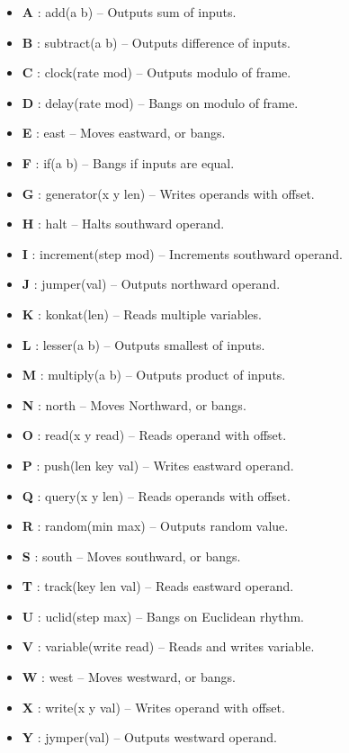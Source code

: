 \documentclass[a4paper]{report}
\begin{document}
\begin{itemize}
  \item \textbf{A} : add(a b) -- Outputs sum of inputs.
  \item \textbf{B} : subtract(a b) -- Outputs difference of inputs.
  \item \textbf{C} : clock(rate mod) -- Outputs modulo of frame.
  \item \textbf{D} : delay(rate mod) -- Bangs on modulo of frame.
  \item \textbf{E} : east -- Moves eastward, or bangs.
  \item \textbf{F} : if(a b) -- Bangs if inputs are equal.
  \item \textbf{G} : generator(x y len) -- Writes operands with offset.
  \item \textbf{H} : halt -- Halts southward operand.
  \item \textbf{I} : increment(step mod) -- Increments southward operand.
  \item \textbf{J} : jumper(val) -- Outputs northward operand.
  \item \textbf{K} : konkat(len) -- Reads multiple variables.
  \item \textbf{L} : lesser(a b) -- Outputs smallest of inputs.
  \item \textbf{M} : multiply(a b) -- Outputs product of inputs.
  \item \textbf{N} : north -- Moves Northward, or bangs.
  \item \textbf{O} : read(x y read) -- Reads operand with offset.
  \item \textbf{P} : push(len key val) -- Writes eastward operand.
  \item \textbf{Q} : query(x y len) -- Reads operands with offset.
  \item \textbf{R} : random(min max) -- Outputs random value.
  \item \textbf{S} : south -- Moves southward, or bangs.
  \item \textbf{T} : track(key len val) -- Reads eastward operand.
  \item \textbf{U} : uclid(step max) -- Bangs on Euclidean rhythm.
  \item \textbf{V} : variable(write read) -- Reads and writes variable.
  \item \textbf{W} : west -- Moves westward, or bangs.
  \item \textbf{X} : write(x y val) -- Writes operand with offset.
  \item \textbf{Y} : jymper(val) -- Outputs westward operand.

\end{itemize}
\end{document}
